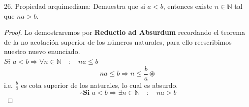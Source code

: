 \documentclass{article}
\begin{document}
  26. Propiedad arquimediana: Demuestra que si \(a<b\), entonces existe \(n\in\mathbb{N}\) tal que \(na>b\). \\
\begin{proof}
    Lo demostraremos por \textbf{Reductio ad Absurdum} recordando el teorema de la no acotación superior de los números naturales, para ello reescribimos nuestro nuevo enunciado.\\
    \(\textit{Si }a<b \Rightarrow \forall n\in\mathbb{N} \quad : \quad na \leq b\) \\
    \[  na \leq b \Rightarrow n \leq \frac{b}{a} \circledast \]
    i.e. \(\frac{b}{a}\) es cota superior de los naturales, lo cual es absurdo.\\
    \[ \therefore \textbf{Si }a<b \Rightarrow \exists n\in\mathbb{N} \quad : \quad na > b \]
\end{proof}
\end{document}

